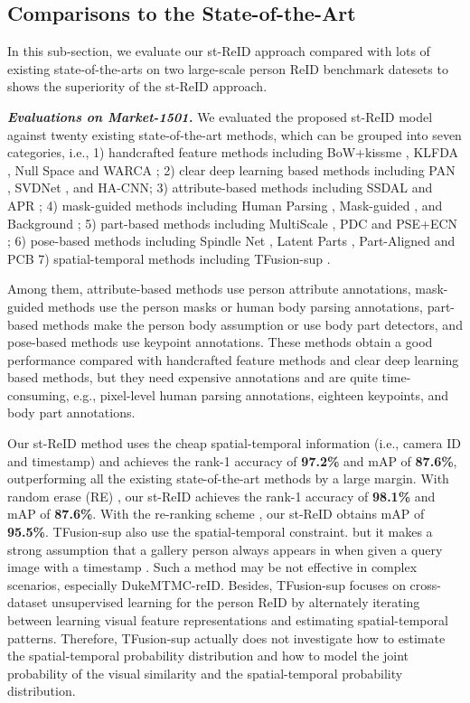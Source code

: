 \documentclass[letterpaper]{article} \usepackage{aaai19}  \usepackage{times}  \usepackage{helvet}  \usepackage{courier}  \usepackage{url}  \usepackage{graphicx}  \usepackage{subfig}
\begin{document}
\subsection{Comparisons to the State-of-the-Art}
In this sub-section, we evaluate our st-ReID approach compared with lots of existing state-of-the-arts on two large-scale person ReID benchmark datesets to shows the superiority of the st-ReID approach.

\textbf{\emph{Evaluations on Market-1501.}} We evaluated the proposed st-ReID model against twenty existing state-of-the-art methods, which can be grouped into seven categories, i.e., 1) handcrafted feature methods including BoW+kissme \cite{zheng2015scalable}, KLFDA \cite{karanam2016arXiv}, Null Space \cite{Zhang_2016_CVPR} and WARCA \cite{Jose2016eccv}; 2) clear deep learning based methods including PAN \cite{zheng2017axkiv}, SVDNet \cite{Sun_2017_ICCV}, and HA-CNN; 3) attribute-based methods including SSDAL \cite{Su2016} and APR \cite{Lin2016}; 4) mask-guided methods including Human Parsing \cite{Kalayeh_2018_CVPR}, Mask-guided \cite{Song_2018_CVPR}, and Background \cite{Tian_2018_CVPR}; 5) part-based methods including  MultiScale \cite{chen2017cvprw}, PDC \cite{Su2017ICCV} and PSE+ECN \cite{Sarfraz_2018_CVPR}; 6) pose-based methods including Spindle Net \cite{Zhao_2017_CVPR}, Latent Parts \cite{Li_2017_CVPR}, Part-Aligned \cite{Zhao_2017_ICCV} and PCB 7) spatial-temporal methods including TFusion-sup \cite{Lv_2018_CVPR}.

Among them, attribute-based methods use person attribute annotations, mask-guided methods use the person masks or human body parsing annotations, part-based methods make the person body assumption or use body part detectors, and pose-based methods use keypoint annotations. These methods obtain a good performance compared with handcrafted feature methods and clear deep learning based methods, but they need expensive annotations and are quite time-consuming, e.g., pixel-level human parsing annotations, eighteen keypoints, and body part annotations.

Our st-ReID method uses the cheap spatial-temporal information (i.e., camera ID and timestamp) and achieves the rank-1 accuracy of \textbf{97.2\%} and mAP of \textbf{87.6\%}, outperforming all the existing state-of-the-art methods by a large margin. With random erase (RE) \cite{random_erase}, our st-ReID achieves  the rank-1 accuracy of \textbf{98.1\%} and mAP of \textbf{87.6\%}. With the re-ranking scheme \cite{Zhong_2017_CVPR}, our st-ReID obtains mAP of \textbf{95.5\%}. TFusion-sup also use the spatial-temporal constraint. but it makes a strong assumption that a gallery person always appears in  when given a query image with a timestamp . Such a method may be not effective in complex scenarios, especially  DukeMTMC-reID. Besides, TFusion-sup focuses on cross-dataset unsupervised learning for the person ReID by alternately iterating between learning visual feature representations and estimating spatial-temporal patterns. Therefore, TFusion-sup actually does not investigate how to estimate the spatial-temporal probability distribution and how to model the joint probability of the visual similarity and the spatial-temporal probability distribution.
\end{document}
